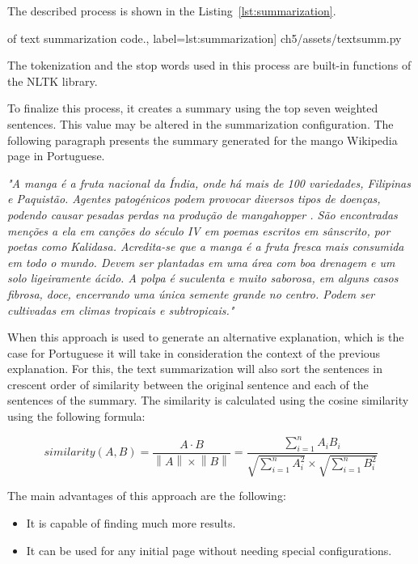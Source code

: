 The described process is shown in the Listing~\ref{lst:summarization}.

\begin{center}
\begin{minipage}{0.95\linewidth}
 of text summarization code.,
label=lst:summarization]
{ch5/assets/textsumm.py}
\end{minipage}
\end{center}

The tokenization and the stop words used in this process are built-in functions of the NLTK library.

To finalize this process, it creates a summary using the top seven weighted sentences.
This value may be altered in the summarization configuration.
The following paragraph presents the summary generated for the mango Wikipedia page in Portuguese.

\textit{"A manga é a fruta nacional da Índia, onde há mais de 100 variedades, Filipinas e Paquistão.
Agentes patogénicos podem provocar diversos tipos de doenças, podendo causar pesadas perdas na produção de mangahopper .
São encontradas menções a ela em canções do século IV em poemas escritos em sânscrito, por poetas como Kalidasa.
Acredita-se que a manga é a fruta fresca mais consumida em todo o mundo.
Devem ser plantadas em uma área com boa drenagem e um solo ligeiramente ácido.
A polpa é suculenta e muito saborosa, em alguns casos fibrosa, doce, encerrando uma única semente grande no centro.
Podem ser cultivadas em climas tropicais e subtropicais."}

When this approach is used to generate an alternative explanation, which is the case for Portuguese it will take in consideration the context of the previous explanation.
For this, the text summarization will also sort the sentences in crescent order of similarity between the original sentence and each of the sentences of the summary.
The similarity is calculated using the cosine similarity using the following formula:

\begin{equation}
    {similarity(A,B)} = \frac{A \cdot B}{\left \| A \right \| \times \left \| B \right \|}= \frac{\sum_{i=1}^{n} A_{i}B_{i}}{\sqrt{\sum_{i=1}^{n} A_{i}^{2}} \times \sqrt{\sum_{i=1}^{n} B_{i}^{2}}}
\label{similarity}
\end{equation}

The main advantages of this approach are the following:
\begin{itemize}
        \item It is capable of finding much more results.
        \item It can be used for any initial page without needing special configurations.
\end{itemize}

